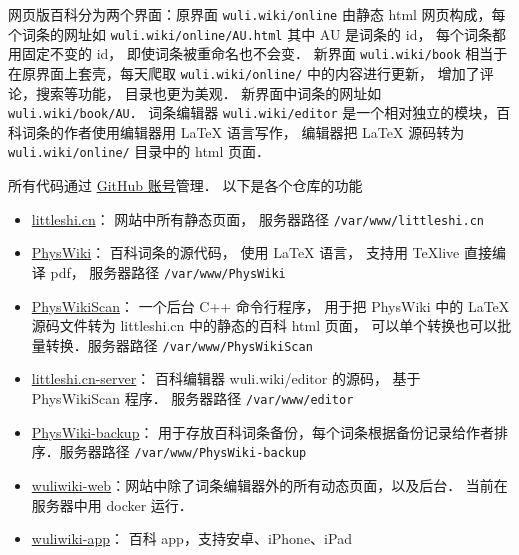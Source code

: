 
网页版百科分为两个界面：原界面 \verb|wuli.wiki/online| 由静态 html 网页构成，每个词条的网址如 \verb|wuli.wiki/online/AU.html| 其中 AU 是词条的 id， 每个词条都用固定不变的 id， 即使词条被重命名也不会变．  新界面 \verb|wuli.wiki/book| 相当于在原界面上套壳，每天爬取 \verb|wuli.wiki/online/| 中的内容进行更新， 增加了评论，搜索等功能， 目录也更为美观． 新界面中词条的网址如 \verb|wuli.wiki/book/AU|．
词条编辑器 \verb|wuli.wiki/editor| 是一个相对独立的模块，百科词条的作者使用编辑器用 LaTeX 语言写作， 编辑器把 LaTeX 源码转为 \verb|wuli.wiki/online/| 目录中的 html 页面．

所有代码通过 \href{https://github.com/MacroUniverse}{GitHub 账号}管理． 以下是各个仓库的功能
\begin{itemize}
\item \href{https://github.com/MacroUniverse/littleshi.cn}{littleshi.cn}： 网站中所有静态页面， 服务器路径 \verb|/var/www/littleshi.cn|
\item \href{https://github.com/MacroUniverse/PhysWiki}{PhysWiki}： 百科词条的源代码， 使用 LaTeX 语言， 支持用 TeXlive 直接编译 pdf， 服务器路径 \verb|/var/www/PhysWiki|
\item \href{https://github.com/MacroUniverse/PhysWikiScan}{PhysWikiScan}： 一个后台 C++ 命令行程序， 用于把 PhysWiki 中的 LaTeX 源码文件转为 littleshi.cn 中的静态的百科 html 页面， 可以单个转换也可以批量转换．服务器路径 \verb|/var/www/PhysWikiScan|
\item \href{https://github.com/MacroUniverse/littleshi.cn-server}{littleshi.cn-server}： 百科编辑器 wuli.wiki/editor 的源码， 基于 PhysWikiScan 程序． 服务器路径 \verb|/var/www/editor|
\item \href{https://github.com/MacroUniverse/PhysWiki-backup}{PhysWiki-backup}： 用于存放百科词条备份，每个词条根据备份记录给作者排序．服务器路径 \verb|/var/www/PhysWiki-backup|
\item \href{https://github.com/MacroUniverse/wuliwiki-web}{wuliwiki-web}：网站中除了词条编辑器外的所有动态页面，以及后台． 当前在服务器中用 docker 运行．
\item \href{https://github.com/MacroUniverse/wuliwiki-app}{wuliwiki-app}： 百科 app，支持安卓、iPhone、iPad
\end{itemize}
